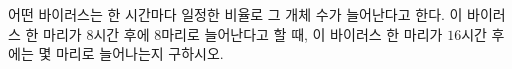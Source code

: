 어떤 바이러스는 한 시간마다 일정한 비율로 그 개체 수가 늘어난다고 한다. 이 바이러스 한 마리가 $8$시간 후에 $8$마리로 늘어난다고 할 때, 이 바이러스 한 마리가 $16$시간 후에는 몇 마리로 늘어나는지 구하시오.

